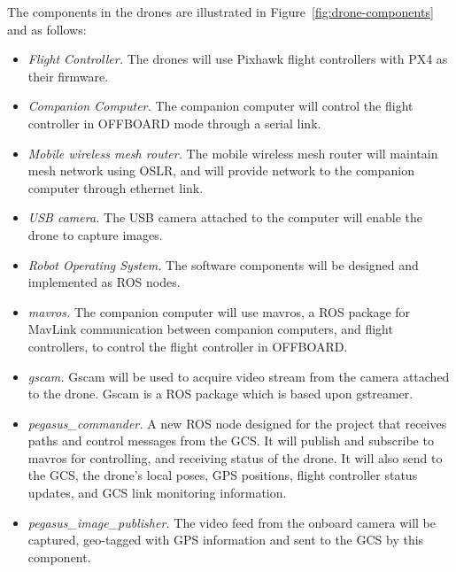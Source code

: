 The components in the drones are illustrated in Figure~\ref{fig:drone-components} and as follows:
\begin{itemize}
	\item \textit{Flight Controller.} The drones will use Pixhawk flight controllers with PX4 as their firmware.
	\item \textit{Companion Computer.} The companion computer will control the flight controller in OFFBOARD mode through a serial link.
	\item \textit{Mobile wireless mesh router.} The mobile wireless mesh router will maintain mesh network using OSLR, and will provide network to the companion computer through ethernet link.
	\item \textit{USB camera.} The USB camera attached to the computer will enable the drone to capture images.
	\item \textit{Robot Operating System.} The software components will be designed and implemented as ROS nodes.
	\item \textit{mavros.} The companion computer will use mavros, a ROS package for MavLink communication between companion computers, and flight controllers, to control the flight controller in OFFBOARD.
	\item \textit{gscam.}  Gscam will be used to acquire video stream from the camera attached to the drone. Gscam is a ROS package which is based upon gstreamer.
	\item \textit{pegasus\_commander.} A new ROS node designed for the project that receives paths and control messages from the GCS. It will publish and subscribe to mavros for controlling, and receiving status of the drone. It will also send to the GCS, the drone's local poses, GPS positions, flight controller status updates, and GCS link monitoring information.
	\item \textit{pegasus\_image\_publisher.} The video feed from the onboard camera will be captured, geo-tagged with GPS information and sent to the GCS by this component.
\end{itemize}

